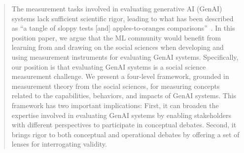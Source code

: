 \documentclass{article}
\begin{document}

\printAffiliationsAndNotice{}

\begin{abstract}
 The measurement tasks involved in evaluating generative AI (GenAI) systems lack sufficient scientific rigor, leading to what has been described as ``a tangle of sloppy tests [and] apples-to-oranges comparisons''~\cite{roose2024ai}. In this position paper, we argue that the ML community would benefit from learning from and drawing on the social sciences when developing and using measurement instruments for evaluating GenAI systems. Specifically, our position is that evaluating GenAI systems is a social science measurement challenge. We present a four-level framework, grounded in measurement theory from the social sciences, for measuring concepts related to the capabilities, behaviors, and impacts of GenAI systems. This framework has two important implications: First, it can broaden the expertise involved in evaluating GenAI systems by enabling stakeholders with different perspectives to participate in conceptual debates. Second, it brings rigor to both conceptual and operational debates by offering a set of lenses for interrogating validity.
\end{abstract}
\end{document}
